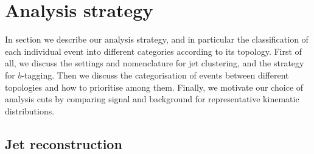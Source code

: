 
\section{Analysis strategy}
\label{sec:analysis}

In section we describe our analysis strategy, and in particular
the classification of each individual event into
different categories according to its topology.
%
First of all, we discuss the settings and nomenclature
for jet clustering, and the strategy for $b$-tagging.
%
Then we discuss the categorisation of events between different
topologies and how to prioritise among them.
%
Finally, we motivate our choice of analysis cuts by comparing signal and background
for representative kinematic distributions.

\subsection{Jet reconstruction}

